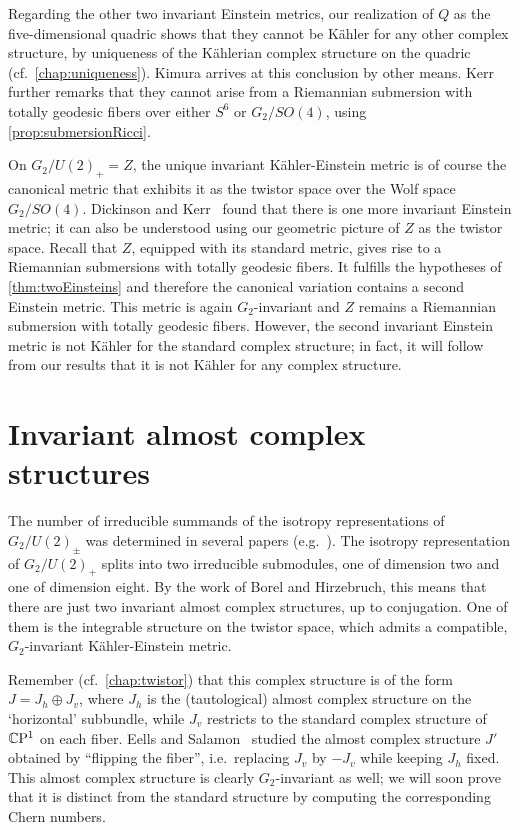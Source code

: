 Regarding the other two invariant Einstein metrics, our realization of $Q$ as the five-dimensional quadric shows that they cannot be K\"ahler for any other complex structure, by uniqueness of the K\"ahlerian complex structure on the quadric (cf.~\cref{chap:uniqueness}). Kimura arrives at this conclusion by other means. Kerr~\cite[Rem.~5.4]{Ker1996} further remarks that they cannot arise from a Riemannian submersion with totally geodesic fibers over either $S^6$ or $G_2/SO(4)$, using \cref{prop:submersionRicci}.

On $G_2/U(2)_+=Z$, the unique invariant K\"ahler-Einstein metric is of course the canonical metric that exhibits it as the twistor space over the Wolf space $G_2/SO(4)$. Dickinson and Kerr~\cite{DK2008} found that there is one more invariant Einstein metric; it can also be understood using our geometric picture of $Z$ as the twistor space. Recall that $Z$, equipped with its standard metric, gives rise to a Riemannian submersions with totally geodesic fibers. It fulfills the hypotheses of \cref{thm:twoEinsteins} and therefore the canonical variation contains a second Einstein metric. This metric is again $G_2$-invariant and $Z$ remains a Riemannian submersion with totally geodesic fibers.
However, the second invariant Einstein metric is not K\"ahler for the standard complex structure; in fact, it will follow from our results that it is not K\"ahler for any complex structure. 

\section{Invariant almost complex structures}
\label{sec:ACSs}

The number of irreducible summands of the isotropy representations of $G_2/U(2)_\pm$ was determined in several papers (e.g.~\cite{GNO2017,AC2011}). The isotropy representation of $G_2/U(2)_+$ splits into two irreducible submodules, one of dimension two and one of dimension eight. By the work of Borel and Hirzebruch, this means that there are just two invariant almost complex structures, up to conjugation. One of them is the integrable structure on the twistor space, which admits a compatible, $G_2$-invariant K\"ahler-Einstein metric.

Remember (cf.~\cref{chap:twistor}) that this complex structure is of the form $J=J_h\oplus J_v$, where $J_h$ is the (tautological) almost complex structure on the `horizontal' subbundle, while $J_v$ restricts to the standard complex structure of $\mathbb{C}\mathrm{P}^1$ on each fiber. Eells and Salamon~\cite{ES1985,Sal1985} studied the almost complex structure $J'$ obtained by ``flipping the fiber'', i.e.~replacing $J_v$ by $-J_v$ while keeping $J_h$ fixed.
This almost complex structure is clearly $G_2$-invariant as well; we will soon prove that it is distinct from the standard structure by computing the corresponding Chern numbers. 

